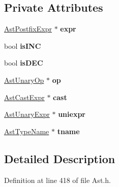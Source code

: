 \subsection*{Private Attributes}
\begin{DoxyCompactItemize}
\item 
\hypertarget{classAstUnaryExpr_aba63616a6671ffe16f3cff6fd2bfd303}{\hyperlink{classAstPostfixExpr}{Ast\-Postfix\-Expr} $\ast$ {\bfseries expr}}\label{classAstUnaryExpr_aba63616a6671ffe16f3cff6fd2bfd303}

\item 
\hypertarget{classAstUnaryExpr_a76418e6a58878a1da236456a7e232168}{bool {\bfseries is\-I\-N\-C}}\label{classAstUnaryExpr_a76418e6a58878a1da236456a7e232168}

\item 
\hypertarget{classAstUnaryExpr_af5b5ac5242011e11a12a6697812ec459}{bool {\bfseries is\-D\-E\-C}}\label{classAstUnaryExpr_af5b5ac5242011e11a12a6697812ec459}

\item 
\hypertarget{classAstUnaryExpr_ae83e3998a7815424cdd8d3a78be10566}{\hyperlink{classAstUnaryOp}{Ast\-Unary\-Op} $\ast$ {\bfseries op}}\label{classAstUnaryExpr_ae83e3998a7815424cdd8d3a78be10566}

\item 
\hypertarget{classAstUnaryExpr_a50ed86402a6819ebb0523f97b2d673d1}{\hyperlink{classAstCastExpr}{Ast\-Cast\-Expr} $\ast$ {\bfseries cast}}\label{classAstUnaryExpr_a50ed86402a6819ebb0523f97b2d673d1}

\item 
\hypertarget{classAstUnaryExpr_a9102108e850ae380a4ffed810d414c71}{\hyperlink{classAstUnaryExpr}{Ast\-Unary\-Expr} $\ast$ {\bfseries uniexpr}}\label{classAstUnaryExpr_a9102108e850ae380a4ffed810d414c71}

\item 
\hypertarget{classAstUnaryExpr_a1cb4b566967e6236f41a719a2abcccbd}{\hyperlink{classAstTypeName}{Ast\-Type\-Name} $\ast$ {\bfseries tname}}\label{classAstUnaryExpr_a1cb4b566967e6236f41a719a2abcccbd}

\end{DoxyCompactItemize}


\subsection{Detailed Description}


Definition at line 418 of file Ast.\-h.



